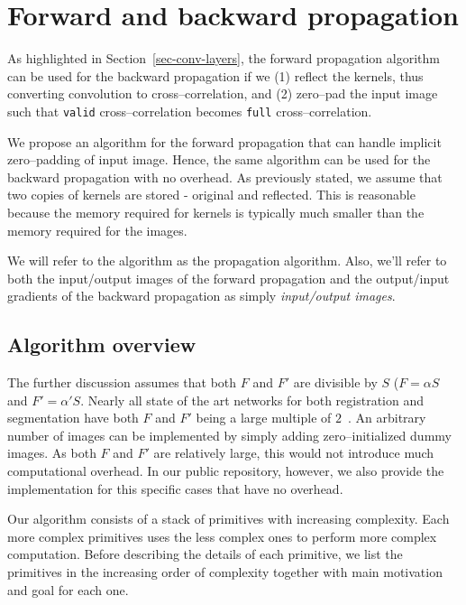 \section{Forward and backward propagation}

  As highlighted in Section~\ref{sec-conv-layers}, the forward
  propagation algorithm can be used for the backward propagation if we
  (1) reflect the kernels, thus converting convolution to
  cross--correlation, and (2) zero--pad the input image such that
  \texttt{valid} cross--correlation becomes \texttt{full}
  cross--correlation.

  We propose an algorithm for the forward propagation that can handle
  implicit zero--padding of input image. Hence, the same algorithm can
  be used for the backward propagation with no overhead.  As
  previously stated, we assume that two copies of kernels are stored -
  original and reflected.  This is reasonable because the memory
  required for kernels is typically much smaller than the memory
  required for the images.

  We will refer to the algorithm as the propagation algorithm.  Also,
  we'll refer to both the input/output images of the forward
  propagation and the output/input gradients of the backward
  propagation as simply \emph{input/output images}.

  \subsection{Algorithm overview}

  The further discussion assumes that both $F$ and $F'$ are divisible
  by $S$ ($F = \alpha S$ and $F' = \alpha' S$.  Nearly all state of
  the art networks for both registration and segmentation have both
  $F$ and $F'$ being a large multiple of
  $2$~\cite{krizhevsky2012imagenet, ronneberger2015u,
    simonyan2014very, sermanet2013overfeat, long2015fully,
    tran2015learning, ji20133d, maturana_iros_2015,
    maturana_icra_2014}.  An arbitrary number of images can be
  implemented by simply adding zero--initialized dummy images.  As
  both $F$ and $F'$ are relatively large, this would not introduce
  much computational overhead.  In our public repository, however, we
  also provide the implementation for this specific cases that have no
  overhead.

  Our algorithm consists of a stack of primitives with increasing
  complexity.  Each more complex primitives uses the less complex ones
  to perform more complex computation.  Before describing the details
  of each primitive, we list the primitives in the increasing order of
  complexity together with main motivation and goal for each one.

